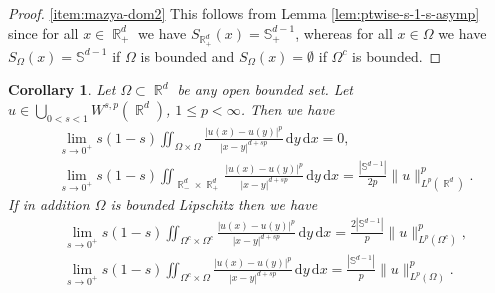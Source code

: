 \documentclass[12pt, reqno]{amsart}%
\theoremstyle{plain}  %
\newtheorem{corollary}[theorem]{Corollary}
\theoremstyle{definition}  %
\theoremstyle{remark}
\numberwithin{equation}{section}
\DeclareMathOperator{\R}{\mathbb{R}}
\renewcommand{\d}{\,\mathrm{d}}
\begin{document}
\begin{proof}
\eqref{item:mazya-dom2} This follows from Lemma \ref{lem:ptwise-s-1-s-asymp} since for all $x\in \R^d_+$ we have  $S_{\R^d_+}(x)=\mathbb{S}^{d-1}_+$, whereas for all $x\in \Omega$ we have  $S_{\Omega}(x)=\mathbb{S}^{d-1}$ if $\Omega$ is bounded and $S_{\Omega}(x)=\emptyset$ if $\Omega^c$ is bounded.
\end{proof}

\begin{corollary}
 Let $\Omega\subset \R^d$ be any open bounded set. Let $u\in \bigcup_{0 < s < 1} W^{s,p}(\R^d)$, $1\leq p<\infty$. Then we have
\begin{align*}
&\lim_{s\to 0^+}
s(1-s) \iint_{\Omega \times \Omega}
\frac{|u(x) - u(y)|^p}{|x-y|^{d+sp}} \d y \d x=0,\\
&\lim_{s\to 0^+}
s(1-s) \iint_{\R^d_- \times \R^d_+}
\frac{|u(x) - u(y)|^p}{|x-y|^{d+sp}} \d y \d x=\frac{|\mathbb{S}^{d-1}|}{2p}\|u\|^p_{L^p(\R^d)}.
\end{align*}
If in addition $\Omega$ is bounded Lipschitz then we have
\begin{align*}
&\lim_{s\to 0^+}
s(1-s) \iint_{\Omega^c \times \Omega^c}
\frac{|u(x) - u(y)|^p}{|x-y|^{d+sp}} \d y \d x=
\frac{2|\mathbb{S}^{d-1}|}{p}\|u\|^p_{L^p(\Omega^c)},\\
&\lim_{s\to 0^+}
s(1-s) \iint_{\Omega^c \times \Omega}
\frac{|u(x) - u(y)|^p}{|x-y|^{d+sp}} \d y \d x=\frac{|\mathbb{S}^{d-1}|}{p}\|u\|^p_{L^p(\Omega)}.
\end{align*}
\end{corollary}
\end{document}
